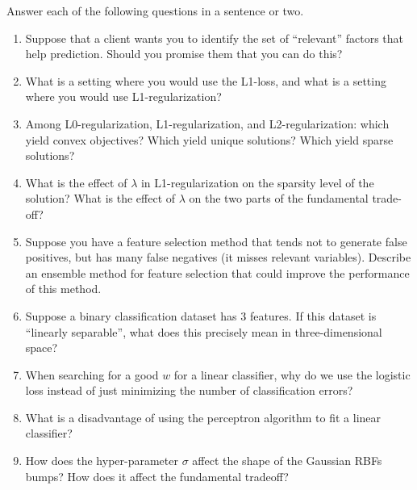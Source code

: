 \documentclass{article}
\newcommand{\blu}[1]{{\textcolor{blu}{#1}}}
\let\ask\blu
\begin{document}
\ask{Answer each of the following questions in a sentence or two.}
\begin{enumerate}

\item Suppose that a client wants you to identify the set of ``relevant'' factors that help prediction. Should you promise them that you can do this?

\item What is a setting where you would use the L1-loss, and what is a setting where you would use L1-regularization?

\item Among L0-regularization, L1-regularization, and L2-regularization: which yield convex objectives? Which yield unique solutions? Which yield sparse solutions?

\item What is the effect of $\lambda$ in L1-regularization on the sparsity level of the solution? What is the effect of $\lambda$ on the two parts of the fundamental trade-off?

\item Suppose you have a feature selection method that tends not to generate false positives, but has many false negatives (it misses relevant variables). Describe an ensemble method for feature selection that could improve the performance of this method.

\item Suppose a binary classification dataset has 3 features. If this dataset is ``linearly separable'', what does this precisely mean in three-dimensional space?

\item When searching for a good $w$ for a linear classifier, why do we use the logistic loss instead of just minimizing the number of classification errors?


\item What is a disadvantage of using the perceptron algorithm to fit a linear classifier?

\item How does the hyper-parameter $\sigma$ affect the shape of the Gaussian RBFs bumps? How does it affect the fundamental tradeoff?

\end{enumerate}
\end{document}
